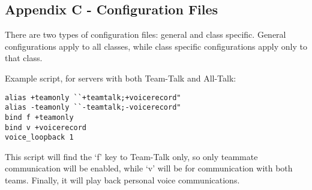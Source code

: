 \subsection{Appendix C - Configuration Files}
There are two types of configuration files: general and class specific. General configurations apply to all classes, while class specific configurations apply only to that class. 

Example script, for servers with both Team-Talk and All-Talk:
\begin{lstlisting}
alias +teamonly ``+teamtalk;+voicerecord"
alias -teamonly ``-teamtalk;-voicerecord"
bind f +teamonly
bind v +voicerecord
voice_loopback 1
\end{lstlisting}

This script will find the `f' key to Team-Talk only, so only teammate communication will be enabled, while `v' will be for communication with both teams.  Finally, it will play back personal voice communications.